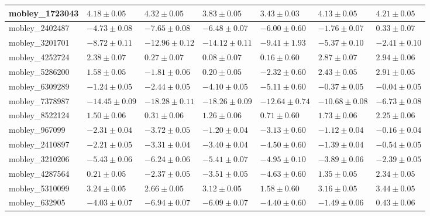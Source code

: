 \documentclass{article}
\begin{document}
\begin{landscape}
\begin{longtable}{|l{3.0cm}|l{3.0cm}|l{3.2cm}|l{3.6cm}|l{3.0cm}|l{3.0cm}|l{3.0cm}|}
mobley\_1723043	&	$	4.18	\pm	0.05	$	&	$	4.32	\pm	0.05	$	&	$	3.83	\pm	0.05	$	&	$	3.43	\pm	0.03	$	&	$	4.13	\pm	0.05	$	&	$	4.21	\pm	0.05	$	\\ \hline
mobley\_2402487	&	$	-4.73	\pm	0.08	$	&	$	-7.65	\pm	0.08	$	&	$	-6.48	\pm	0.07	$	&	$	-6.00	\pm	0.60	$	&	$	-1.76	\pm	0.07	$	&	$	0.33	\pm	0.07	$	\\ \hline
mobley\_3201701	&	$	-8.72	\pm	0.11	$	&	$	-12.96	\pm	0.12	$	&	$	-14.12	\pm	0.11	$	&	$	-9.41	\pm	1.93	$	&	$	-5.37	\pm	0.10	$	&	$	-2.41	\pm	0.10	$	\\ \hline
mobley\_4252724	&	$	2.38	\pm	0.07	$	&	$	0.27	\pm	0.07	$	&	$	0.08	\pm	0.07	$	&	$	0.16	\pm	0.60	$	&	$	2.87	\pm	0.07	$	&	$	2.94	\pm	0.06	$	\\ \hline
mobley\_5286200	&	$	1.58	\pm	0.05	$	&	$	-1.81	\pm	0.06	$	&	$	0.20	\pm	0.05	$	&	$	-2.32	\pm	0.60	$	&	$	2.43	\pm	0.05	$	&	$	2.91	\pm	0.05	$	\\ \hline
mobley\_6309289	&	$	-1.24	\pm	0.05	$	&	$	-2.44	\pm	0.05	$	&	$	-4.10	\pm	0.05	$	&	$	-5.11	\pm	0.60	$	&	$	-0.37	\pm	0.05	$	&	$	-0.04	\pm	0.05	$	\\ \hline
mobley\_7378987	&	$	-14.45	\pm	0.09	$	&	$	-18.28	\pm	0.11	$	&	$	-18.26	\pm	0.09	$	&	$	-12.64	\pm	0.74	$	&	$	-10.68	\pm	0.08	$	&	$	-6.73	\pm	0.08	$	\\ \hline
mobley\_8522124	&	$	1.50	\pm	0.06	$	&	$	0.31	\pm	0.06	$	&	$	1.26	\pm	0.06	$	&	$	0.71	\pm	0.60	$	&	$	1.73	\pm	0.06	$	&	$	2.25	\pm	0.06	$	\\ \hline
mobley\_967099	&	$	-2.31	\pm	0.04	$	&	$	-3.72	\pm	0.05	$	&	$	-1.20	\pm	0.04	$	&	$	-3.13	\pm	0.60	$	&	$	-1.12	\pm	0.04	$	&	$	-0.16	\pm	0.04	$	\\ \hline
mobley\_2410897	&	$	-2.21	\pm	0.05	$	&	$	-3.31	\pm	0.04	$	&	$	-3.40	\pm	0.04	$	&	$	-4.50	\pm	0.60	$	&	$	-1.39	\pm	0.04	$	&	$	-0.54	\pm	0.05	$	\\ \hline
mobley\_3210206	&	$	-5.43	\pm	0.06	$	&	$	-6.24	\pm	0.06	$	&	$	-5.41	\pm	0.07	$	&	$	-4.95	\pm	0.10	$	&	$	-3.89	\pm	0.06	$	&	$	-2.39	\pm	0.05	$	\\ \hline
mobley\_4287564	&	$	0.21	\pm	0.05	$	&	$	-2.37	\pm	0.05	$	&	$	-3.51	\pm	0.05	$	&	$	-4.63	\pm	0.60	$	&	$	1.35	\pm	0.05	$	&	$	2.34	\pm	0.05	$	\\ \hline
mobley\_5310099	&	$	3.24	\pm	0.05	$	&	$	2.66	\pm	0.05	$	&	$	3.12	\pm	0.05	$	&	$	1.58	\pm	0.60	$	&	$	3.16	\pm	0.05	$	&	$	3.44	\pm	0.05	$	\\ \hline
mobley\_632905	&	$	-4.03	\pm	0.07	$	&	$	-6.94	\pm	0.07	$	&	$	-6.09	\pm	0.07	$	&	$	-4.40	\pm	0.60	$	&	$	-1.49	\pm	0.06	$	&	$	0.43	\pm	0.06	$	\\ \hline

\end{longtable}
\end{landscape}
\end{document}

